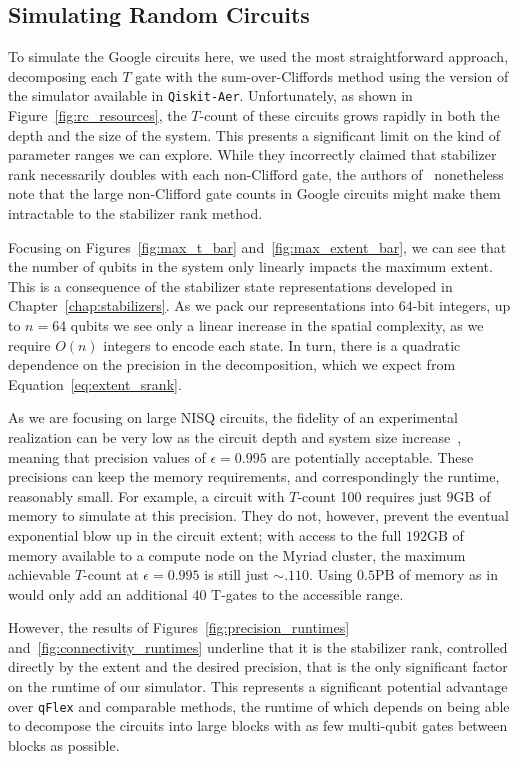\subsection{Simulating Random Circuits}
To simulate the Google circuits here, we used the most straightforward approach, decomposing each $T$ gate with the sum-over-Cliffords method using the version of the simulator available in \texttt{Qiskit-Aer}. Unfortunately, as shown in Figure~\ref{fig:rc_resources}, the $T$-count of these circuits grows rapidly in both the depth and the size of the system. This presents a significant limit on the kind of parameter ranges we can explore. While they incorrectly claimed that stabilizer rank necessarily doubles with each non-Clifford gate, the authors of~\cite{Villalonga2019} nonetheless note that the large non-Clifford gate counts in Google circuits might make them intractable to the stabilizer rank method.\par
Focusing on Figures~\ref{fig:max_t_bar} and~\ref{fig:max_extent_bar}, we can see that the number of qubits in the system only linearly impacts the maximum extent. This is a consequence of the stabilizer state representations developed in Chapter~\ref{chap:stabilizers}. As we pack our representations into $64$-bit integers, up to $n=64$ qubits we see only a linear increase in the spatial complexity, as we require $O(n)$ integers to encode each state. In turn, there is a quadratic dependence on the precision in the decomposition, which we expect from Equation~\ref{eq:extent_srank}.\par
As we are focusing on large NISQ circuits, the fidelity of an experimental realization can be very low as the circuit depth and system size increase~\cite{Villalonga2018,Villalonga2019}, meaning that precision values of $\epsilon=0.995$ are potentially acceptable. These precisions can keep the memory requirements, and correspondingly the runtime, reasonably small. For example, a circuit with $T$-count 100 requires just $9\mathrm{GB}$ of memory to simulate at this precision. They do not, however, prevent the eventual exponential blow up in the circuit extent; with access to the full $192\mathrm{GB}$ of memory available to a compute node on the Myriad cluster, the maximum achievable $T$-count at $\epsilon=0.995$ is still just $\sim. 110$. Using $0.5\mathrm{PB}$ of memory as in~\cite{Villalonga2019} would only add an additional $40$ T-gates to the accessible range.\par
However, the results of Figures~\ref{fig:precision_runtimes} and~\ref{fig:connectivity_runtimes} underline that it is the stabilizer rank, controlled directly by the extent and the desired precision, that is the only significant factor on the runtime of our simulator. This represents a significant potential advantage over \texttt{qFlex} and comparable methods, the runtime of which depends on being able to decompose the circuits into large blocks with as few multi-qubit gates between blocks as possible.\par
